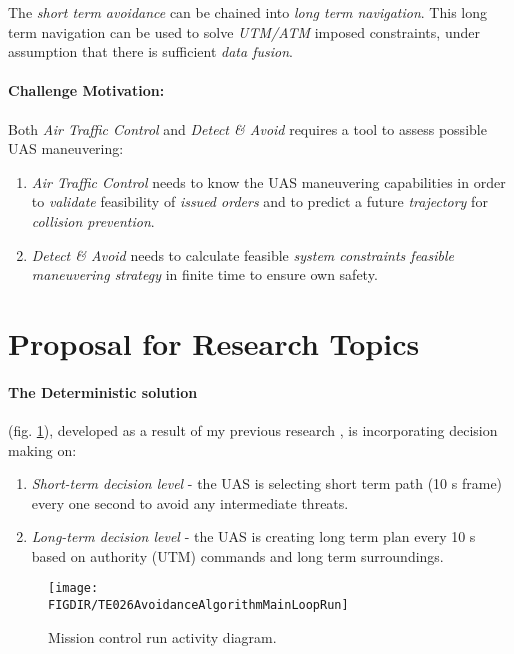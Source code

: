 \documentclass[a4paper,narrowmargins,11pt,oneside,onehalfspaced,singlespacednotes]{fcup-thesis}
\newcommand{\FIGDIR}{./Pics}    %
\theoremstyle{plain}
\theoremstyle{plain}
\theoremstyle{remark}
\begin{document}
The \emph{short term avoidance} can be chained into \emph{long term navigation}. This long term navigation can be used to solve \emph{UTM/ATM} imposed constraints, under assumption that there is sufficient \emph{data fusion}.

\paragraph{Challenge Motivation:} Both \emph{Air Traffic Control} and \emph{Detect \& Avoid} requires a tool to assess possible UAS maneuvering:

\begin{enumerate}
    \item \emph{Air Traffic Control} needs to know the UAS maneuvering capabilities in order to \emph{validate} feasibility of \emph{issued orders} and to predict a future \emph{trajectory} for \emph{collision prevention}.
    
    \item \emph{Detect \& Avoid} needs to calculate feasible \emph{system constraints feasible maneuvering strategy} in finite time to ensure own safety. 
\end{enumerate}

\section*{Proposal for Research Topics}
\paragraph{The Deterministic solution} (fig. \ref{fig:missionControlRunActivityDiagram}), developed as a result of my previous research \cite{gomola2017probabilistic,gomola2017obstacle}, is incorporating decision making on:
\begin{enumerate}
	\item\emph{Short-term decision level} - the UAS is selecting short term path (10 s frame) every one second to avoid any intermediate threats.
	\item\emph{Long-term  decision level} - the UAS is creating long term plan every 10 s based on authority (UTM) commands and long term surroundings.
\end{enumerate}
\begin{figure}[H]
    \centering
    \texttt{[image: \\FIGDIR/TE026AvoidanceAlgorithmMainLoopRun]}
    \caption{Mission control run activity diagram.}
    \label{fig:missionControlRunActivityDiagram}
\end{figure}
\end{document}
